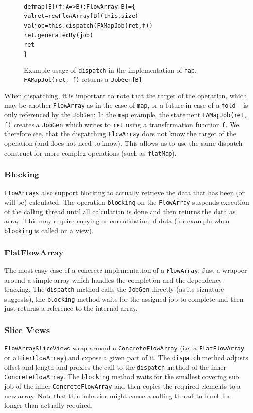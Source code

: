 \documentclass[runningheads,a4paper,fleqn]{llncs}
\begin{document}
\begin{figure}
\begin{alltt}
{\scriptsize
def map[B](f: A => B): FlowArray[B] = \{
    val ret = newFlowArray[B](this.size)
    val job = this.dispatch(FAMapJob(ret, f))
    ret.generatedBy(job)
    ret
\}
}
\end{alltt}
\caption{Example usage of \texttt{dispatch} in the implementation of
  \texttt{map}. \texttt{FAMapJob(ret, f)} returns a
  \texttt{JobGen[B]}}
\label{fig:dispatch-example}
\end{figure}

When dispatching, it is important to note that the target of the
operation, which may be another \texttt{FlowArray} as in the case of
\texttt{map}, or a future in case of a \texttt{fold} -- is only
referenced by the \texttt{JobGen}: In the \texttt{map} example, the
statement \texttt{FAMapJob(ret, f)} creates a
\texttt{JobGen} which writes to \texttt{ret} using a transformation
function \texttt{f}. We therefore see, that the dispatching \texttt{FlowArray}
does not know the target of the operation (and does not need to
know). This allows us to use the same dispatch construct for more
complex operations (such as \texttt{flatMap}).

\subsubsection{Blocking}
\texttt{FlowArrays} also support blocking to actually retrieve the data that
has been (or will be) calculated. The operation \texttt{blocking} on
the \texttt{FlowArray} suspends execution of the calling thread until all
calculation is done and then returns the data as array. This may
require copying or consolidation of data (for example when
\texttt{blocking} is called on a view).

\subsubsection{FlatFlowArray}
The most easy case of a concrete implementation of a \texttt{FlowArray}: Just a
wrapper around a simple array which handles the completion and the
dependency tracking. The \texttt{dispatch} method calls the
\texttt{JobGen} directly (as its signature suggests), the
\texttt{blocking} method waits for the assigned job to complete and
then just returns a reference to the internal array.

\subsubsection{Slice Views}
\texttt{FlowArraySliceViews} wrap around a \texttt{ConcreteFlowArray}
(i.e. a \texttt{FlatFlowArray} or a \texttt{HierFlowArray})
and expose a given part of it. The \texttt{dispatch} method adjusts 
offset and length and proxies the call to the \texttt{dispatch} method
of the inner
\texttt{ConcreteFlowArray}. The \texttt{blocking} method waits for the
smallest covering sub job of the inner \texttt{ConcreteFlowArray} and
then copies the required elements to a new array. Note that this
behavior might cause a calling thread to block for longer than
actually required.
\end{document}
